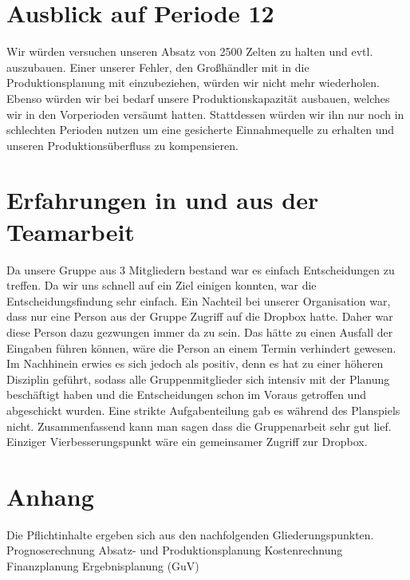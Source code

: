 \documentclass[a4paper, 12pt]{report}
\begin{document}
\begin{flushleft}
\chapter{Ausblick auf Periode 12}
Wir würden versuchen unseren Absatz von 2500 Zelten zu halten und evtl. auszubauen.
Einer unserer Fehler, den Großhändler mit in die Produktionsplanung mit einzubeziehen, würden wir nicht mehr wiederholen.
Ebenso würden wir bei bedarf unsere Produktionskapazität ausbauen, welches wir in den Vorperioden versäumt hatten.
Stattdessen würden wir ihn nur noch in schlechten Perioden nutzen um eine gesicherte Einnahmequelle zu erhalten und unseren Produktionsüberfluss zu kompensieren.


\chapter{Erfahrungen in und aus der Teamarbeit}
Da unsere Gruppe aus 3 Mitgliedern bestand war es einfach Entscheidungen zu treffen.
Da wir uns schnell auf ein Ziel einigen konnten, war die Entscheidungsfindung sehr einfach.
Ein Nachteil bei unserer Organisation war, dass nur eine Person aus der Gruppe Zugriff auf die Dropbox hatte.
Daher war diese Person dazu gezwungen immer da zu sein.
Das hätte zu einen Ausfall der Eingaben führen können, wäre die Person an einem Termin verhindert gewesen.
Im Nachhinein erwies es sich jedoch als positiv, denn es hat zu einer höheren Disziplin geführt, sodass alle Gruppenmitglieder sich intensiv mit der Planung beschäftigt haben und die Entscheidungen schon im Voraus getroffen und abgeschickt wurden.
Eine strikte Aufgabenteilung gab es während des Planspiels nicht.
Zusammenfassend kann man sagen dass die Gruppenarbeit sehr gut lief.
Einziger Vierbesserungspunkt wäre ein gemeinsamer Zugriff zur Dropbox. 

\chapter{Anhang}



Die Pflichtinhalte ergeben sich aus den nachfolgenden Gliederungspunkten.
Prognoserechnung
Absatz- und Produktionsplanung
Kostenrechnung
Finanzplanung
Ergebnisplanung (GuV)

%
%



\end{flushleft}
\end{document}
